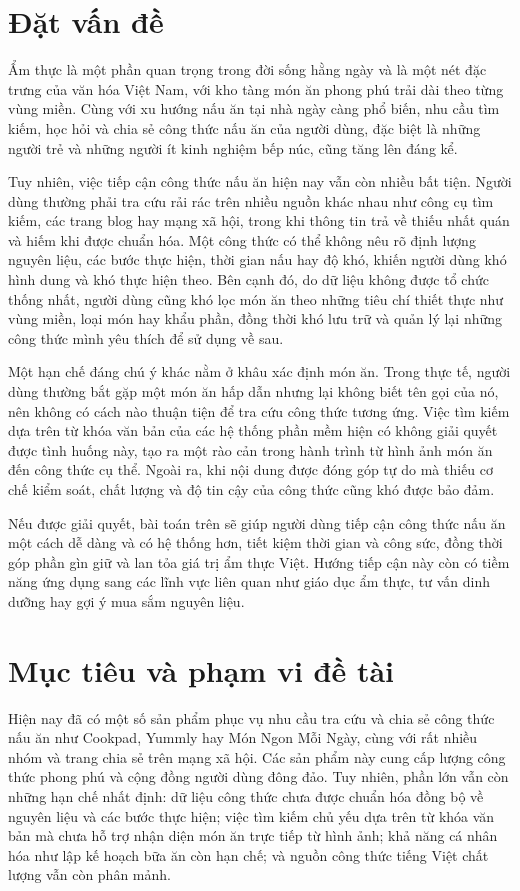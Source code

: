 \documentclass[../DoAn.tex]{subfiles}
\begin{document}
\section{Đặt vấn đề}
\label{section:1.1}
Ẩm thực là một phần quan trọng trong đời sống hằng ngày và là một nét đặc trưng của văn hóa Việt Nam, với kho tàng món ăn phong phú trải dài theo từng vùng miền. Cùng với xu hướng nấu ăn tại nhà ngày càng phổ biến, nhu cầu tìm kiếm, học hỏi và chia sẻ công thức nấu ăn của người dùng, đặc biệt là những người trẻ và những người ít kinh nghiệm bếp núc, cũng tăng lên đáng kể.

Tuy nhiên, việc tiếp cận công thức nấu ăn hiện nay vẫn còn nhiều bất tiện. Người dùng thường phải tra cứu rải rác trên nhiều nguồn khác nhau như công cụ tìm kiếm, các trang blog hay mạng xã hội, trong khi thông tin trả về thiếu nhất quán và hiếm khi được chuẩn hóa. Một công thức có thể không nêu rõ định lượng nguyên liệu, các bước thực hiện, thời gian nấu hay độ khó, khiến người dùng khó hình dung và khó thực hiện theo. Bên cạnh đó, do dữ liệu không được tổ chức thống nhất, người dùng cũng khó lọc món ăn theo những tiêu chí thiết thực như vùng miền, loại món hay khẩu phần, đồng thời khó lưu trữ và quản lý lại những công thức mình yêu thích để sử dụng về sau.

Một hạn chế đáng chú ý khác nằm ở khâu xác định món ăn. Trong thực tế, người dùng thường bắt gặp một món ăn hấp dẫn nhưng lại không biết tên gọi của nó, nên không có cách nào thuận tiện để tra cứu công thức tương ứng. Việc tìm kiếm dựa trên từ khóa văn bản của các hệ thống phần mềm hiện có không giải quyết được tình huống này, tạo ra một rào cản trong hành trình từ hình ảnh món ăn đến công thức cụ thể. Ngoài ra, khi nội dung được đóng góp tự do mà thiếu cơ chế kiểm soát, chất lượng và độ tin cậy của công thức cũng khó được bảo đảm.

Nếu được giải quyết, bài toán trên sẽ giúp người dùng tiếp cận công thức nấu ăn một cách dễ dàng và có hệ thống hơn, tiết kiệm thời gian và công sức, đồng thời góp phần gìn giữ và lan tỏa giá trị ẩm thực Việt. Hướng tiếp cận này còn có tiềm năng ứng dụng sang các lĩnh vực liên quan như giáo dục ẩm thực, tư vấn dinh dưỡng hay gợi ý mua sắm nguyên liệu.

\section{Mục tiêu và phạm vi đề tài}
\label{section:1.2}
Hiện nay đã có một số sản phẩm phục vụ nhu cầu tra cứu và chia sẻ công thức nấu ăn như Cookpad, Yummly hay Món Ngon Mỗi Ngày, cùng với rất nhiều nhóm và trang chia sẻ trên mạng xã hội. Các sản phẩm này cung cấp lượng công thức phong phú và cộng đồng người dùng đông đảo. Tuy nhiên, phần lớn vẫn còn những hạn chế nhất định: dữ liệu công thức chưa được chuẩn hóa đồng bộ về nguyên liệu và các bước thực hiện; việc tìm kiếm chủ yếu dựa trên từ khóa văn bản mà chưa hỗ trợ nhận diện món ăn trực tiếp từ hình ảnh; khả năng cá nhân hóa như lập kế hoạch bữa ăn còn hạn chế; và nguồn công thức tiếng Việt chất lượng vẫn còn phân mảnh.
\end{document}
